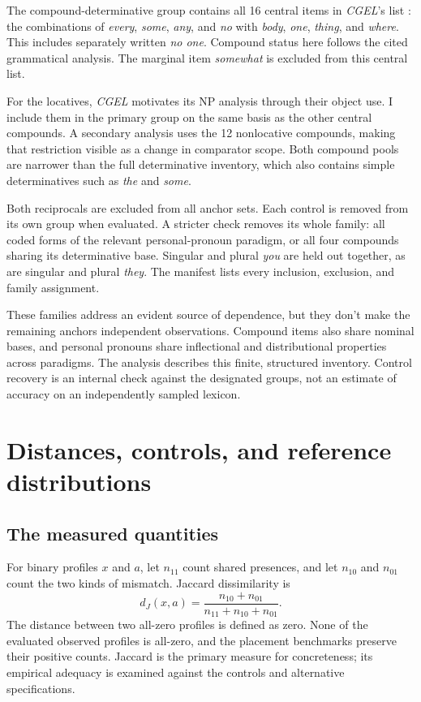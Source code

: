\documentclass[12pt]{article}
\providecommand{\mention}[1]{\textit{#1}}
\begin{document}
The compound-determinative group contains all 16 central items in \textit{CGEL}'s list \citep[Ch.~5, \S9.6, example~41]{huddleston2002}: the combinations of \mention{every}, \mention{some}, \mention{any}, and \mention{no} with \mention{body}, \mention{one}, \mention{thing}, and \mention{where}. This includes separately written \mention{no one}. Compound status here follows the cited grammatical analysis. The marginal item \mention{somewhat} is excluded from this central list.

For the locatives, \textit{CGEL} motivates its NP analysis through their object use. I include them in the primary group on the same basis as the other central compounds. A secondary analysis uses the 12 nonlocative compounds, making that restriction visible as a change in comparator scope. Both compound pools are narrower than the full determinative inventory, which also contains simple determinatives such as \mention{the} and \mention{some}.

Both reciprocals are excluded from all anchor sets. Each control is removed from its own group when evaluated. A stricter check removes its whole family: all coded forms of the relevant personal-pronoun paradigm, or all four compounds sharing its determinative base. Singular and plural \mention{you} are held out together, as are singular and plural \mention{they}. The manifest lists every inclusion, exclusion, and family assignment.

These families address an evident source of dependence, but they don't make the remaining anchors independent observations. Compound items also share nominal bases, and personal pronouns share inflectional and distributional properties across paradigms. The analysis describes this finite, structured inventory. Control recovery is an internal check against the designated groups, not an estimate of accuracy on an independently sampled lexicon.

\section{Distances, controls, and reference distributions}
\label{sec:methods}

\subsection{The measured quantities}

For binary profiles $x$ and $a$, let $n_{11}$ count shared presences, and let $n_{10}$ and $n_{01}$ count the two kinds of mismatch. Jaccard dissimilarity is
\[
 d_J(x,a)=\frac{n_{10}+n_{01}}{n_{11}+n_{10}+n_{01}}.
\]
The distance between two all-zero profiles is defined as zero. None of the evaluated observed profiles is all-zero, and the placement benchmarks preserve their positive counts. Jaccard is the primary measure for concreteness; its empirical adequacy is examined against the controls and alternative specifications.
\end{document}
